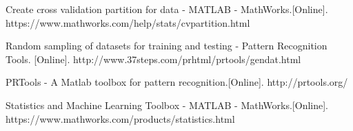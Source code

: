 \begin{thebibliography}{5}
 Create cross validation partition for data - MATLAB - MathWorks.[Online]. https://www.mathworks.com/help/stats/cvpartition.html

 Random sampling of datasets for training and testing - Pattern Recognition Tools. [Online]. http://www.37steps.com/prhtml/prtools/gendat.html

 PRTools - A Matlab toolbox for pattern recognition.[Online]. http://prtools.org/

 Statistics and Machine Learning Toolbox - MATLAB - MathWorks.[Online]. https://www.mathworks.com/products/statistics.html
\end{thebibliography}